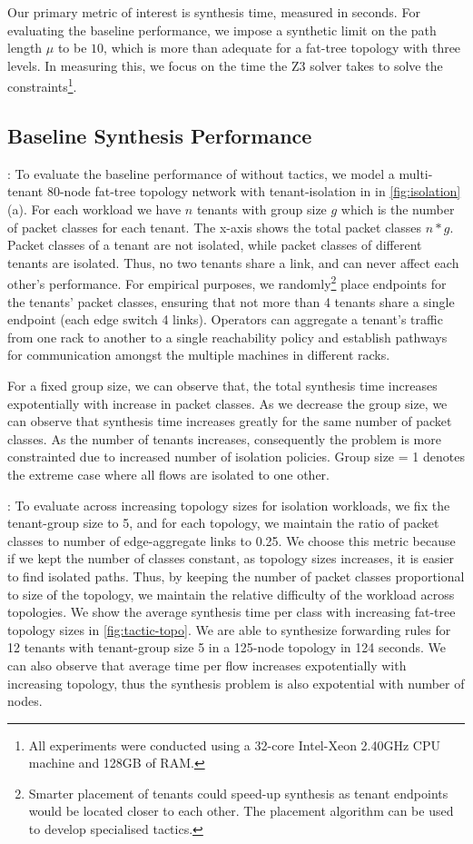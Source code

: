 Our primary metric of interest is synthesis time, measured in
seconds. For evaluating the baseline performance, we impose a
synthetic limit on the path length $\mu$ to be $10$, which is more than adequate 
for a fat-tree topology with three levels. 
In measuring this, we focus on the time the Z3 solver takes
to solve the constraints\footnote{All experiments were conducted using a
 32-core Intel-Xeon 2.40GHz CPU machine and
128GB of RAM.}.
\subsection{Baseline Synthesis Performance} \label{sec:baselineeval} 
: To evaluate the baseline performance of \Name without tactics, we model a multi-tenant
80-node fat-tree topology network with   
tenant-isolation in in \cref{fig:isolation}(a). 
For each workload we have $n$ tenants with group size $g$ which 
is the number of packet classes for each tenant. The x-axis shows the total packet classes $n*g$. 
Packet classes of a tenant are not isolated, while packet classes
of different tenants are isolated. Thus, no two tenants share a link, and can never affect
each other's performance. For empirical purposes, 
we randomly\footnote{
	Smarter placement of tenants could speed-up synthesis as tenant endpoints would
	be located closer to each other. The placement algorithm can be used to develop specialised tactics.}
  place endpoints for the tenants' packet classes, ensuring that not more than 4 tenants share a single endpoint
  (each edge switch 4 links). 
   Operators can aggregate a tenant's traffic from one rack to
another to a single reachability policy and establish pathways for communication amongst the multiple
machines in different racks. 

For a fixed group size, we can observe that,
the total synthesis time increases expotentially with increase in packet classes.
 As we decrease the group size,
 we can observe that synthesis time increases greatly for the same number of packet classes.
 As the number of tenants increases, consequently the problem is more constrainted 
  due to increased number of isolation policies. 
 Group size = 1 denotes the extreme case where all flows are isolated to one other. 

:
 To evaluate \Name across increasing topology sizes for isolation workloads, 
we fix the tenant-group size to 5, and for each topology, we maintain
 the ratio of packet classes to number of edge-aggregate links to 0.25. 
We choose this metric because if we kept the number of classes constant,
as topology sizes increases, it is easier to find isolated paths. Thus, by keeping
the number of packet classes proportional to size of the topology, we maintain
the relative difficulty of the workload across topologies. 
We show the average synthesis time per class with
 increasing fat-tree topology sizes in \cref{fig:tactic-topo}. 
 We are able to synthesize forwarding rules for 
 12 tenants with tenant-group size 5 in a 125-node topology in 124 seconds. 
  We can also observe that average time per flow increases expotentially 
  with increasing topology, 
  thus the synthesis problem is also expotential with number of nodes.
  
